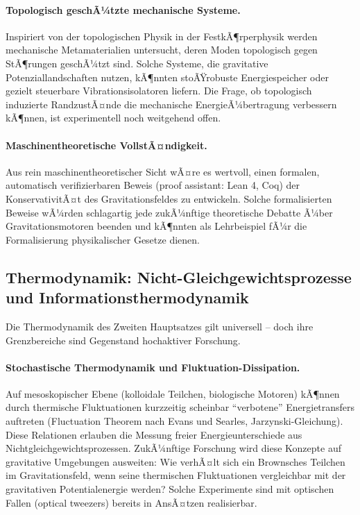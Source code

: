 ﻿\documentclass[12pt, a4paper]{report}
\theoremstyle{definition}
\theoremstyle{remark}
\begin{document}
\paragraph{Topologisch geschÃ¼tzte mechanische Systeme.}
Inspiriert von der topologischen Physik in der FestkÃ¶rperphysik werden
mechanische Metamaterialien untersucht, deren Moden topologisch gegen
StÃ¶rungen geschÃ¼tzt sind. Solche Systeme, die gravitative Potenziallandschaften
nutzen, kÃ¶nnten stoÃŸrobuste Energiespeicher oder gezielt steuerbare
Vibrationsisolatoren liefern. Die Frage, ob topologisch induzierte
RandzustÃ¤nde die mechanische EnergieÃ¼bertragung verbessern kÃ¶nnen, ist
experimentell noch weitgehend offen.

\paragraph{Maschinentheoretische VollstÃ¤ndigkeit.}
Aus rein maschinentheoretischer Sicht wÃ¤re es wertvoll, einen formalen,
automatisch verifizierbaren Beweis (proof assistant: Lean 4, Coq) der
KonservativitÃ¤t des Gravitationsfeldes zu entwickeln. Solche formalisierten
Beweise wÃ¼rden schlagartig jede zukÃ¼nftige theoretische Debatte Ã¼ber
Gravitationsmotoren beenden und kÃ¶nnten als Lehrbeispiel fÃ¼r die
Formalisierung physikalischer Gesetze dienen.

\subsection{Thermodynamik: Nicht-Gleichgewichtsprozesse und
               Informationsthermodynamik}

Die Thermodynamik des Zweiten Hauptsatzes gilt universell -- doch ihre
Grenzbereiche sind Gegenstand hochaktiver Forschung.

\paragraph{Stochastische Thermodynamik und Fluktuation-Dissipation.}
Auf mesoskopischer Ebene (kolloidale Teilchen, biologische Motoren) kÃ¶nnen
durch thermische Fluktuationen kurzzeitig scheinbar ``verbotene'' Energietransfers
auftreten (Fluctuation Theorem nach Evans und Searles, Jarzynski-Gleichung).
Diese Relationen erlauben die Messung freier Energieunterschiede aus
Nichtgleichgewichtsprozessen. ZukÃ¼nftige Forschung wird diese Konzepte auf
gravitative Umgebungen ausweiten: Wie verhÃ¤lt sich ein Brownsches Teilchen im
Gravitationsfeld, wenn seine thermischen Fluktuationen vergleichbar mit der
gravitativen Potentialenergie werden? Solche Experimente sind mit optischen
Fallen (optical tweezers) bereits in AnsÃ¤tzen realisierbar.
\end{document}
